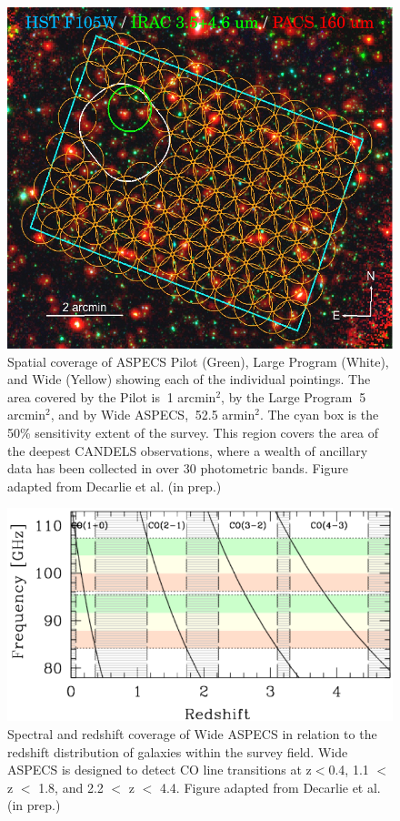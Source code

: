 \begin{figure}[tbp]
\centering \includegraphics[width=120mm]{Wide_ASPECS_Coverage.png}
\caption{Spatial coverage of ASPECS Pilot (Green), Large Program (White), and Wide (Yellow) showing each of the individual pointings. The area covered by the Pilot is $~$1 arcmin$^2$, by the Large Program $~$5 arcmin$^2$, and by Wide ASPECS, $~$52.5 armin$^2$. The cyan box is the 50\% sensitivity extent of the survey. This region covers the area of the deepest CANDELS observations, where a wealth of ancillary data has been collected in over 30 photometric bands. Figure adapted from Decarlie et al. (in prep.)}
\label{fig:ASPECS_Coverage}
\end{figure}

\begin{figure}[tbp]
\centering
\includegraphics[width=120mm]{Wide_ASPECS_Freq.png}
\caption{Spectral and redshift coverage of Wide ASPECS in relation to the redshift distribution of galaxies within the survey field. Wide ASPECS is designed to detect CO line transitions at z$<$0.4, 1.1 $<$ z $<$ 1.8, and 2.2 $<$ z $<$ 4.4. Figure adapted from Decarlie et al. (in prep.)}
\label{fig:ASPECS_Freq}
\end{figure}

